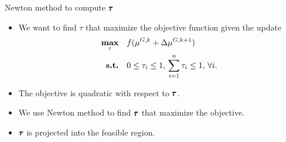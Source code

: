 \documentclass[first=dgreen,second=purple,logo=yellowexc]{aaltoslides}
\begin{document}
\begin{frame}{Newton method to compute $\pmb{\tau}$}
	\begin{itemize}\footnotesize
		\item We want to find $\tau$ that maximize the objective function given the update
		\begin{align*}
			\underset{\tau}{\textbf{max}} & \quad f(\mathbf {\mu}^{G,k} + \Delta{\mathbf {\mu}}^{G,k+1})\\
			\textbf{s.t.} & \quad 0\le\tau_i\le1,\,\sum_{i=1}^n\tau_i\le1,\,\forall i.
		\end{align*}
		\item The objective is quadratic with respect to $\pmb{\tau}$.
		\item We use Newton method to find $\pmb{\tau}$ that maximize the objective.
		\item $\pmb{\tau}$ is projected into the feasible region.
	\end{itemize}
\end{frame}
\end{document}
